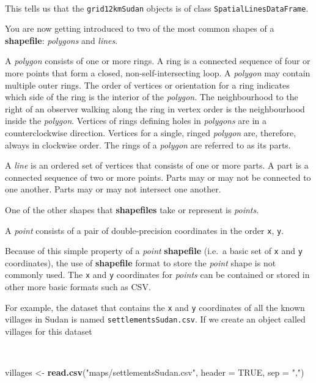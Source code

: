 \documentclass[12pt,a4paper,a4paper]{book}
\newenvironment{Shaded}{\begin{snugshade}}{\end{snugshade}}
\newcommand{\KeywordTok}[1]{\textcolor[rgb]{0.13,0.29,0.53}{\textbf{#1}}}
\newcommand{\DataTypeTok}[1]{\textcolor[rgb]{0.13,0.29,0.53}{#1}}
\newcommand{\StringTok}[1]{\textcolor[rgb]{0.31,0.60,0.02}{#1}}
\newcommand{\OtherTok}[1]{\textcolor[rgb]{0.56,0.35,0.01}{#1}}
\newcommand{\NormalTok}[1]{#1}
\theoremstyle{definition}
\theoremstyle{definition}
\theoremstyle{definition}
\theoremstyle{remark}
\begin{document}
~

This tells us that the \texttt{grid12kmSudan} objects is of class
\texttt{SpatialLinesDataFrame}.

You are now getting introduced to two of the most common shapes of a
\textbf{shapefile}: \emph{polygons} and \emph{lines}.

A \emph{polygon} consists of one or more rings. A ring is a connected
sequence of four or more points that form a closed,
non-self-intersecting loop. A \emph{polygon} may contain multiple outer
rings. The order of vertices or orientation for a ring indicates which
side of the ring is the interior of the \emph{polygon}. The
neighbourhood to the right of an observer walking along the ring in
vertex order is the neighbourhood inside the \emph{polygon}. Vertices of
rings defining holes in \emph{polygons} are in a counterclockwise
direction. Vertices for a single, ringed \emph{polygon} are, therefore,
always in clockwise order. The rings of a \emph{polygon} are referred to
as its parts.

A \emph{line} is an ordered set of vertices that consists of one or more
parts. A part is a connected sequence of two or more points. Parts may
or may not be connected to one another. Parts may or may not intersect
one another.

One of the other shapes that \textbf{shapefiles} take or represent is
\emph{points}.

A \emph{point} consists of a pair of double-precision coordinates in the
order \texttt{x}, \texttt{y}.

Because of this simple property of a \emph{point} \textbf{shapefile}
(i.e.~a basic set of \texttt{x} and \texttt{y} coordinates), the use of
\textbf{shapefile} format to store the \emph{point} shape is not
commonly used. The \texttt{x} and \texttt{y} coordinates for
\emph{points} can be contained or stored in other more basic formats
such as CSV.

For example, the dataset that contains the \texttt{x} and \texttt{y}
coordinates of all the known villages in Sudan is named
\texttt{settlementsSudan.csv}. If we create an object called villages
for this dataset

~

\begin{Shaded}
\begin{Highlighting}[]
\NormalTok{villages <-}\StringTok{ }\KeywordTok{read.csv}\NormalTok{(}\StringTok{"maps/settlementsSudan.csv"}\NormalTok{, }\DataTypeTok{header =} \OtherTok{TRUE}\NormalTok{, }\DataTypeTok{sep =} \StringTok{","}\NormalTok{)}
\end{Highlighting}
\end{Shaded}
\end{document}
